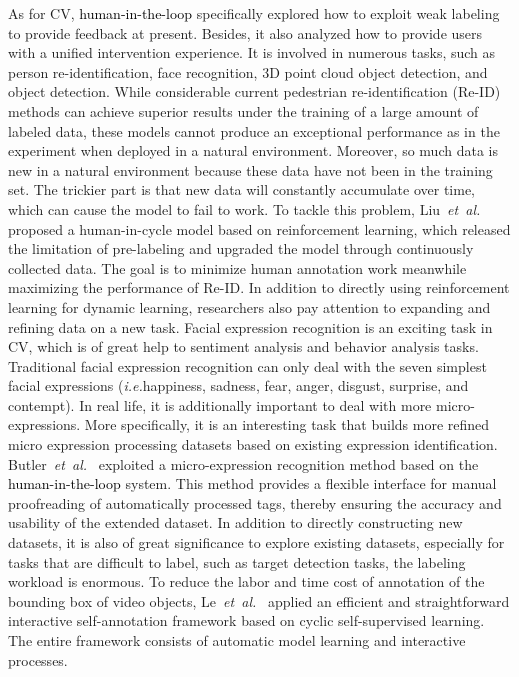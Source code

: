 \documentclass{article}
\newcommand\etal{\emph{et~al.}}
\newcommand\ie{\emph{i.e.}}
\newcommand{\REO}[1]{\textcolor{black}{#1}}
\begin{document}
As for CV, \REO{human-in-the-loop} specifically explored how to exploit weak labeling to provide feedback at present. Besides, it also analyzed how to provide users with a unified intervention experience.
It is involved in numerous tasks, such as person re-identification, face recognition, 3D point cloud object detection, and object detection.
While considerable current pedestrian re-identification (Re-ID) methods can achieve superior results under the training of a large amount of labeled data, these models cannot produce an exceptional performance as in the experiment when deployed in a natural environment. Moreover, so much data is new in a natural environment because these data have not been in the training set. The trickier part is that new data will constantly accumulate over time, which can cause the model to fail to work. To tackle this problem, Liu~\etal~\cite{liu2019deep} proposed a human-in-cycle model based on reinforcement learning, which released the limitation of pre-labeling and upgraded the model through continuously collected data. The goal is to minimize human annotation work meanwhile maximizing the performance of Re-ID.
In addition to directly using reinforcement learning for dynamic learning, researchers also pay attention to expanding and refining data on a new task.
Facial expression recognition is an exciting task in CV, which is of great help to sentiment analysis and behavior analysis tasks. Traditional facial expression recognition can only deal with the seven simplest facial expressions (\ie happiness, sadness, fear, anger, disgust, surprise, and contempt).
In real life, it is additionally important to deal with more micro-expressions. More specifically, it is an interesting task that builds more refined micro expression processing datasets based on existing expression identification. Butler~\etal~\cite{butler2020human} exploited a micro-expression recognition method based on the \REO{human-in-the-loop} system. This method provides a flexible interface for manual proofreading of automatically processed tags, thereby ensuring the accuracy and usability of the extended dataset.
In addition to directly constructing new datasets, it is also of great significance to explore existing datasets, especially for tasks that are difficult to label, such as target detection tasks, the labeling workload is enormous.
To reduce the labor and time cost of annotation of the bounding box of video objects, Le~\etal~\cite{le2020toward} applied an efficient and straightforward interactive self-annotation framework based on cyclic self-supervised learning. The entire framework consists of automatic model learning and interactive processes.
\end{document}
